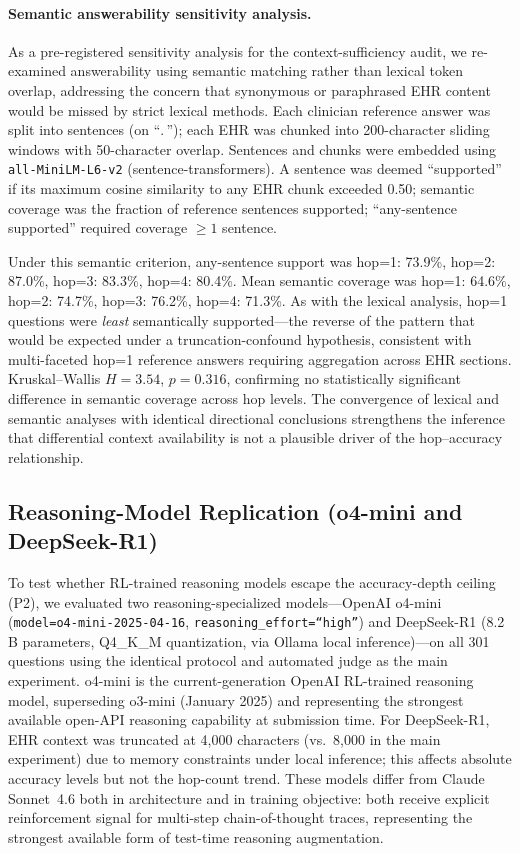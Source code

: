 \documentclass{article}
\begin{document}
\paragraph{Semantic answerability sensitivity analysis.}
As a pre-registered sensitivity analysis for the context-sufficiency audit, we re-examined answerability using semantic matching rather than lexical token overlap, addressing the concern that synonymous or paraphrased EHR content would be missed by strict lexical methods. Each clinician reference answer was split into sentences (on ``$.\,$''); each EHR was chunked into 200-character sliding windows with 50-character overlap. Sentences and chunks were embedded using \texttt{all-MiniLM-L6-v2} (sentence-transformers). A sentence was deemed ``supported'' if its maximum cosine similarity to any EHR chunk exceeded 0.50; semantic coverage was the fraction of reference sentences supported; ``any-sentence supported'' required coverage $\geq 1$ sentence.

Under this semantic criterion, any-sentence support was hop=1: 73.9\%, hop=2: 87.0\%, hop=3: 83.3\%, hop=4: 80.4\%. Mean semantic coverage was hop=1: 64.6\%, hop=2: 74.7\%, hop=3: 76.2\%, hop=4: 71.3\%. As with the lexical analysis, hop=1 questions were \emph{least} semantically supported---the reverse of the pattern that would be expected under a truncation-confound hypothesis, consistent with multi-faceted hop=1 reference answers requiring aggregation across EHR sections. Kruskal--Wallis $H = 3.54$, $p = 0.316$, confirming no statistically significant difference in semantic coverage across hop levels. The convergence of lexical and semantic analyses with identical directional conclusions strengthens the inference that differential context availability is not a plausible driver of the hop--accuracy relationship.

\subsection{Reasoning-Model Replication (o4-mini and DeepSeek-R1)}
\label{app:reasoning_models}

To test whether RL-trained reasoning models escape the accuracy-depth ceiling (P2), we evaluated two reasoning-specialized models---OpenAI o4-mini (\texttt{model=o4-mini-2025-04-16}, \texttt{reasoning\_effort=``high''}) and DeepSeek-R1 (8.2\,B parameters, Q4\_K\_M quantization, via Ollama local inference)---on all 301 questions using the identical protocol and automated judge as the main experiment. o4-mini is the current-generation OpenAI RL-trained reasoning model, superseding o3-mini (January 2025) and representing the strongest available open-API reasoning capability at submission time. For DeepSeek-R1, EHR context was truncated at 4{,}000 characters (vs.\ 8{,}000 in the main experiment) due to memory constraints under local inference; this affects absolute accuracy levels but not the hop-count trend. These models differ from Claude Sonnet~4.6 both in architecture and in training objective: both receive explicit reinforcement signal for multi-step chain-of-thought traces, representing the strongest available form of test-time reasoning augmentation.
\end{document}
